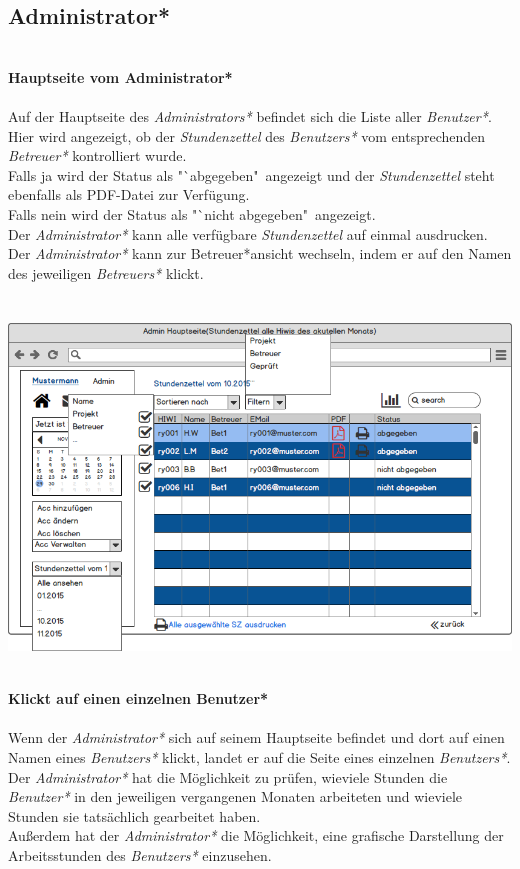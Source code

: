 \subsection{Administrator*}
\textbf{\\Hauptseite vom Administrator*}\\
\\
Auf der Hauptseite des \emph{Administrators*} befindet sich die Liste aller \emph{Benutzer*}. Hier wird angezeigt, ob der \emph{Stundenzettel} des \emph{Benutzers*} vom entsprechenden \emph{Betreuer*} kontrolliert wurde. \\
Falls ja wird der Status als "`abgegeben"\ angezeigt und der \emph{Stundenzettel} steht ebenfalls als PDF-Datei zur Verfügung.\\
Falls nein wird der Status als "`nicht abgegeben"\ angezeigt.\\
Der \emph{Administrator*} kann alle verfügbare \emph{Stundenzettel} auf einmal ausdrucken.\\
Der \emph{Administrator*} kann zur Betreuer*ansicht wechseln, indem er auf den Namen des jeweiligen \emph{Betreuers*} klickt.\\
\\
\\
\includegraphics[width=\linewidth]{UI/Admin/Hauptseite.png}

\newpage
\textbf{\\Klickt auf einen einzelnen Benutzer*}\\
\\
Wenn der \emph{Administrator*} sich auf seinem Hauptseite befindet und dort auf einen Namen eines \emph{Benutzers*} klickt, landet er auf die Seite eines einzelnen \emph{Benutzers*}.\\
Der \emph{Administrator*} hat die Möglichkeit zu prüfen, wieviele Stunden  die \emph{Benutzer*} in den jeweiligen vergangenen Monaten arbeiteten und wieviele Stunden sie tatsächlich gearbeitet haben.\\
Außerdem hat der \emph{Administrator*} die Möglichkeit, eine grafische Darstellung der Arbeitsstunden des \emph{Benutzers*} einzusehen.\\
\\
\\

